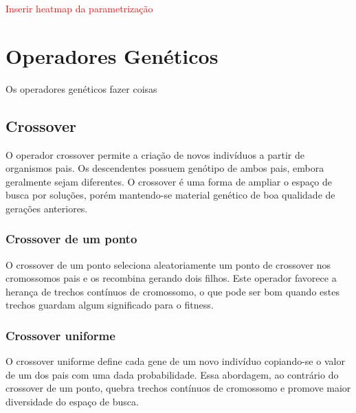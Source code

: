 \documentclass[conference]{IEEEtran}
\newcommand\myworries[1]{\textcolor{red}{#1}}
\begin{document}
\myworries{Inserir heatmap da parametrização}


\section{Operadores Genéticos}
Os operadores genéticos fazer coisas\\

\subsection{Crossover}
O operador crossover permite a criação de novos indivíduos a partir de organismos pais. Os descendentes possuem genótipo de ambos pais, embora geralmente sejam diferentes. O crossover é uma forma de ampliar o espaço de busca por soluções, porém mantendo-se material genético de boa qualidade de gerações anteriores.

\subsubsection{Crossover de um ponto}
O crossover de um ponto seleciona aleatoriamente um ponto de crossover nos cromossomos pais e os recombina gerando dois filhos. Este operador favorece a herança de trechos contínuos de cromossomo, o que pode ser bom quando estes trechos guardam algum significado para o fitness.

\subsubsection{Crossover uniforme}
O crossover uniforme define cada gene de um novo indivíduo copiando-se o valor de um dos pais com uma dada probabilidade. Essa abordagem, ao contrário do crossover de um ponto, quebra trechos contínuos de cromossomo e promove maior diversidade do espaço de busca.



\myworries{}

%
%
\end{document}
